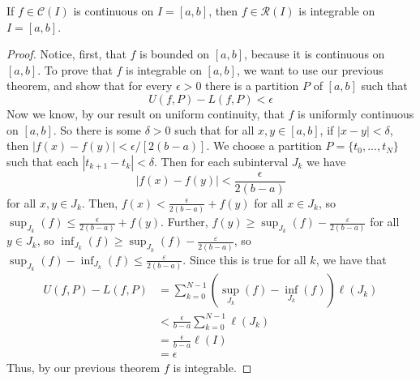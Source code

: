 \begin{thm}
    If $f \in \mathcal{C}(I)$ is continuous on $I=[a,b]$, then $f \in \mathcal{R}(I)$ is integrable on $I=[a,b]$.
\end{thm}
\begin{proof}
    Notice, first, that $f$ is bounded on $[a,b]$, because it is continuous on $[a,b]$. To prove that $f$ is integrable on $[a,b]$, we want to use our previous theorem, and show that for every $\epsilon > 0$ there is a partition $P$ of $[a,b]$ such that \begin{equation*}
        U(f,P) - L(f,P) < \epsilon
    \end{equation*}
    Now we know, by our result on uniform continuity, that $f$ is uniformly continuous on $[a,b]$. So there is some $\delta > 0$ such that for all $x,y \in [a,b]$, if $|x-y| < \delta$, then $|f(x) - f(y)| < \epsilon/[2(b-a)]$. We choose a partition $P = \{t_0,...,t_N\}$ such that each $|t_{k+1}-t_{k}| < \delta$. Then for each subinterval $J_k$ we have \begin{equation*}
        |f(x) - f(y)| < \frac{\epsilon}{2(b-a)}
    \end{equation*}
    for all $x,y \in J_k$. Then, $f(x) < \frac{\epsilon}{2(b-a)}+f(y)$ for all $x\in J_k$, so $\sup_{J_k}(f) \leq \frac{\epsilon}{2(b-a)} + f(y)$. Further, $f(y) \geq \sup_{J_k}(f) - \frac{\varepsilon}{2(b-a)}$ for all $y \in J_k$, so $\inf_{J_k}(f) \geq \sup_{J_k}(f) - \frac{\varepsilon}{2(b-a)}$, so $\sup_{J_k}(f) - \inf_{J_k}(f) \leq \frac{\varepsilon}{2(b-a)}$. Since this is true for all $k$, we have that \begin{align*}
        U(f,P) - L(f,P) &= \sum_{k=0}^{N-1}(\sup_{J_k}(f) - \inf_{J_k}(f))\ell(J_k) \\
        &< \frac{\epsilon}{b-a}\sum_{k=0}^{N-1}\ell(J_k) \\
        &= \frac{\epsilon}{b-a}\ell(I) \\
        &= \epsilon
    \end{align*}
    Thus, by our previous theorem $f$ is integrable.
\end{proof}


